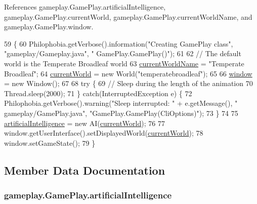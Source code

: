 References gameplay.\-Game\-Play.\-artificial\-Intelligence, gameplay.\-Game\-Play.\-current\-World, gameplay.\-Game\-Play.\-current\-World\-Name, and gameplay.\-Game\-Play.\-window.


\begin{DoxyCode}
59                                            \{
60         Philophobia.getVerbose().information(\textcolor{stringliteral}{"Creating GamePlay class"}, \textcolor{stringliteral}{"gameplay/Gameplay.java"}, \textcolor{stringliteral}{"
      GamePlay.GamePlay()"});
61 
62         \textcolor{comment}{// The default world is the Temperate Broadleaf world}
63         \hyperlink{classgameplay_1_1_game_play_adcc37bdd0470d8adc27fa249d93adcff}{currentWorldName} = \textcolor{stringliteral}{"Temperate Broadleaf"};
64         \hyperlink{classgameplay_1_1_game_play_acac96730473a405274e9ff0a58e4d77e}{currentWorld} = \textcolor{keyword}{new} World(\textcolor{stringliteral}{"temperatebroadleaf"});
65 
66         \hyperlink{classgameplay_1_1_game_play_aed3cc7a8f5e4838bb0b37d4014c6133e}{window} = \textcolor{keyword}{new} Window();
67 
68         \textcolor{keywordflow}{try} \{
69             \textcolor{comment}{// Sleep during the length of the animation}
70             Thread.sleep(2000);
71         \} \textcolor{keywordflow}{catch}(InterruptedException e) \{
72             Philophobia.getVerbose().warning(\textcolor{stringliteral}{"Sleep interrupted: "} + e.getMessage(), \textcolor{stringliteral}{"
      gameplay/GamePlay.java"}, \textcolor{stringliteral}{"GamePlay.GamePlay(CliOptions)"});
73         \}
74 
75         \hyperlink{classgameplay_1_1_game_play_a416406c147a47ba292990aa11064d9aa}{artificialIntelligence} = \textcolor{keyword}{new} AI(\hyperlink{classgameplay_1_1_game_play_acac96730473a405274e9ff0a58e4d77e}{currentWorld});
76 
77         window.getUserInterface().setDisplayedWorld(\hyperlink{classgameplay_1_1_game_play_acac96730473a405274e9ff0a58e4d77e}{currentWorld});
78         window.setGameState();
79     \}
\end{DoxyCode}


\subsection{Member Data Documentation}
\hypertarget{classgameplay_1_1_game_play_a416406c147a47ba292990aa11064d9aa}{
\subsubsection[{artificial\-Intelligence}]{ gameplay.\-Game\-Play.\-artificial\-Intelligence\hspace{0.3cm}{\ttfamily [protected]}}}\label{classgameplay_1_1_game_play_a416406c147a47ba292990aa11064d9aa}



